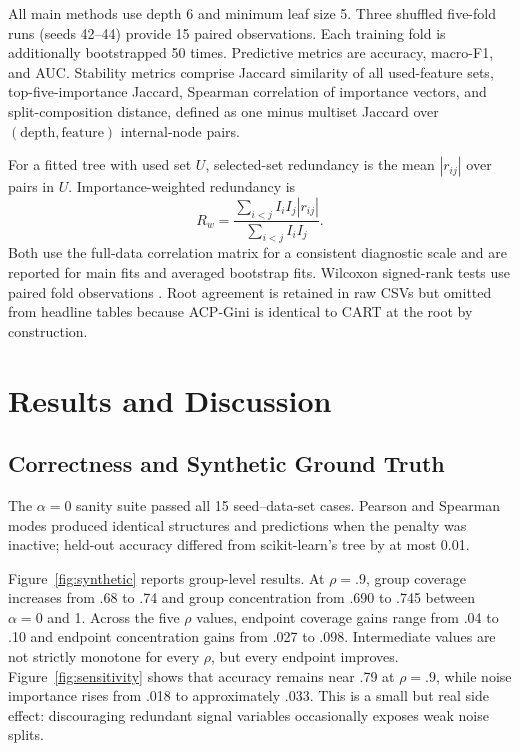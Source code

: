 \documentclass[runningheads]{llncs}
\begin{document}
All main methods use depth 6 and minimum leaf size 5. Three shuffled five-fold runs (seeds 42--44) provide 15 paired observations. Each training fold is additionally bootstrapped 50 times. Predictive metrics are accuracy, macro-F1, and AUC. Stability metrics comprise Jaccard similarity of all used-feature sets, top-five-importance Jaccard, Spearman correlation of importance vectors, and split-composition distance, defined as one minus multiset Jaccard over $(\text{depth},\text{feature})$ internal-node pairs.

For a fitted tree with used set $U$, selected-set redundancy is the mean $|r_{ij}|$ over pairs in $U$. Importance-weighted redundancy is
\begin{equation}
R_w=\frac{\sum_{i<j}I_iI_j|r_{ij}|}{\sum_{i<j}I_iI_j}.
\end{equation}
Both use the full-data correlation matrix for a consistent diagnostic scale and are reported for main fits and averaged bootstrap fits. Wilcoxon signed-rank tests use paired fold observations \cite{demsar2006comparisons}. Root agreement is retained in raw CSVs but omitted from headline tables because ACP-Gini is identical to CART at the root by construction.

\section{Results and Discussion}
\subsection{Correctness and Synthetic Ground Truth}
The $\alpha=0$ sanity suite passed all 15 seed--data-set cases. Pearson and Spearman modes produced identical structures and predictions when the penalty was inactive; held-out accuracy differed from scikit-learn's tree by at most 0.01.

Figure~\ref{fig:synthetic} reports group-level results. At $\rho=.9$, group coverage increases from .68 to .74 and group concentration from .690 to .745 between $\alpha=0$ and 1. Across the five $\rho$ values, endpoint coverage gains range from .04 to .10 and endpoint concentration gains from .027 to .098. Intermediate values are not strictly monotone for every $\rho$, but every endpoint improves. Figure~\ref{fig:sensitivity} shows that accuracy remains near .79 at $\rho=.9$, while noise importance rises from .018 to approximately .033. This is a small but real side effect: discouraging redundant signal variables occasionally exposes weak noise splits.
\end{document}
